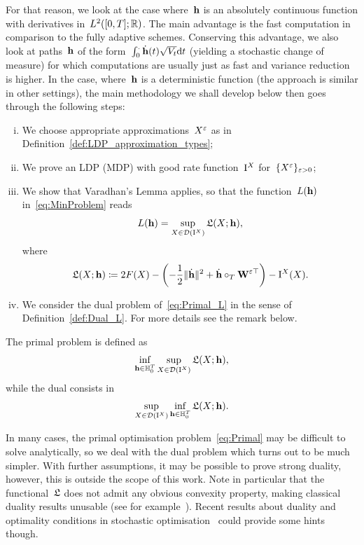 For that reason, we look at the case where~$\boldsymbol{\mathrm{h}}$ is an absolutely continuous function with derivatives in~$L^2([0, T]; \mathbb{R})$.
The main advantage is the fast computation in comparison to the fully adaptive schemes. 
Conserving this advantage, we also look at paths~$\boldsymbol{\mathrm{h}}$ of the form~$\int_0^.\dot{\boldsymbol{\mathrm{h}}}(t)\sqrt{V_t}\mathrm{d} t$ (yielding a stochastic change of measure) for which computations are usually just as fast and variance reduction is higher. 
In the case, where~$\boldsymbol{\mathrm{h}}$ is a deterministic function 
(the approach is similar in other settings), 
the main methodology we shall develop below then goes through the following steps:
\begin{enumerate}[i)]
    \item We choose appropriate approximations~$X^{\varepsilon}$ as in Definition~\ref{def:LDP_approximation_types};
    \item We prove an LDP (MDP) with good rate function~$\mathrm{I}^{X}$ for~$\{X^\varepsilon\}_{\varepsilon>0}$;
    \item We show that Varadhan's Lemma applies, 
    so that the function~$L(\boldsymbol{\mathrm{h}})$ in~\eqref{eq:MinProblem} reads
    \begin{equation}\label{eq:Primal_L}
    L(\boldsymbol{\mathrm{h}}) = \sup_{X\in \mathcal{D}(\mathrm{I}^{X})} \mathfrak{L}(X;\boldsymbol{\mathrm{h}}),
    \end{equation}
where
\begin{equation}\label{eq:TargetFunc}
\mathfrak{L}(X;\boldsymbol{\mathrm{h}}) \coloneqq 2F(X) - \left(-\frac{1}{2}\|\dot{\boldsymbol{\mathrm{h}}}\|^2 + \dot{\boldsymbol{\mathrm{h}}}\circ_T\boldsymbol{\mathrm{W}}^{\varepsilon\top}\right) - \mathrm{I}^{X}(X).
    \end{equation}
    \item We consider the dual problem of~\eqref{eq:Primal_L} in the sense of Definition~\ref{def:Dual_L}. For more details see the remark below.
\end{enumerate}
\begin{definition}\label{def:Dual_L}
The primal problem is defined as
\begin{equation}\label{eq:Primal}
\inf_{\boldsymbol{\mathrm{h}}\in\mathbb{H}^T_0} \sup_{X\in \mathcal{D}(\mathrm{I}^{X})}\mathfrak{L}(X;\boldsymbol{\mathrm{h}}),
\end{equation}
while the dual consists in
\begin{equation}\label{eq:Dual}
\sup_{X\in \mathcal{D}(\mathrm{I}^{X})} \inf_{\boldsymbol{\mathrm{h}}\in\mathbb{H}^T_0} \mathfrak{L}(X;\boldsymbol{\mathrm{h}}).
\end{equation}
\end{definition}
\begin{remark}
In many cases, the primal optimisation problem~\eqref{eq:Primal} may be difficult to solve analytically, so we deal with the dual problem which turns out to be much simpler.
With further assumptions, it may be possible to prove strong duality, however, this is outside the scope of this work.
Note in particular that the functional~$\mathfrak{L}$
does not admit any obvious convexity property, making classical duality results unusable (see for example~\cite[Section~4]{Rockafellar1974ConjugateOptimization}).
Recent results about duality and optimality conditions in stochastic optimisation~\cite{Biagini2018DualityFinance, Pennanen2011ConvexFinance} could provide some hints though.
\end{remark}
